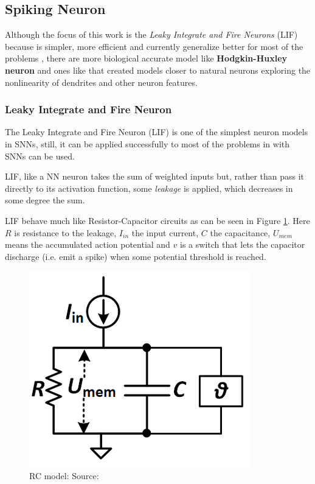 		\subsection{Spiking Neuron}
		\par Although the focus of this work is the \textit{Leaky Integrate and Fire Neurons} (LIF) because is simpler, more efficient and currently generalize better for most of the problems \cite{dan_goodman_2022_7044500}, there are more biological accurate model like \textbf{Hodgkin-Huxley neuron} \cite{gerstner2014neuronal} and ones like \cite{jones2020single} that created models closer to natural neurons exploring the nonlinearity of dendrites and other neuron features.
		
		\subsubsection{Leaky Integrate and Fire Neuron}
		\par The Leaky Integrate and Fire Neuron (LIF) is one of the simplest neuron models in SNNs, still, it can be applied successfully to most of the problems in with SNNs can be used.
		
		\par LIF, like a NN neuron takes the sum of weighted inputs but, rather than pass it directly to its activation function, some \textit{leakage} is applied, which decreases in some degree the sum. 
		\par LIF behave much like Resistor-Capacitor circuits as can be seen in Figure \ref{fig:rcmodel}. Here $R$ is resistance to the leakage, $I_{in}$ the input current, $C$ the capacitance, $U_{mem}$ means the accumulated action potential and $v$ is a switch that lets the capacitor discharge (i.e. emit a spike) when some potential threshold is reached.
		
		\begin{figure}[H]
			\centering
			\includegraphics[width=0.4\linewidth]{images/rcmodel}
			\caption[The RC model]{RC model: Source: \cite{10242251}}
			\label{fig:rcmodel}
		\end{figure}
		
